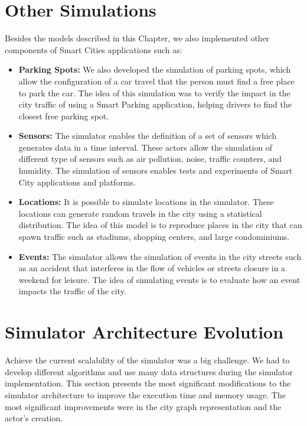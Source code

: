 \section{Other Simulations}
\label{sec:outros}

Besides the models described in this Chapter, we also implemented other components of Smart Cities applications such as:

\begin{itemize}

    \item \textbf{Parking Spots:} We also developed the simulation of parking spots, which allow the configuration of a car travel that the person must find a free place to park the car. The idea of this simulation was to verify the impact in the city traffic of using a Smart Parking application, helping drivers to find the closest free parking spot.
 
    \item \textbf{Sensors:} The simulator enables the definition of a set of sensors which generates data in a time interval. These actors allow the simulation of different type of sensors such as air pollution, noise, traffic counters, and humidity. The simulation of sensors enables tests and experiments of Smart City applications and platforms.
    
    \item \textbf{Locations:} It is possible to simulate locations in the simulator. These locations can generate random travels in the city using a statistical distribution. The idea of this model is to reproduce places in the city that can spawn traffic such as stadiums, shopping centers, and large condominiums.
    
    \item \textbf{Events:} The simulator allows the simulation of events in the city streets such as an accident that interferes in the flow of vehicles or streets closure in a weekend for leisure. The idea of simulating events is to evaluate how an event impacts the traffic of the city.
    
\end{itemize}


\section{Simulator Architecture Evolution}
\label{sec:evolucao}

Achieve the current scalability of the simulator was a big challenge. We had to develop different algorithms and use many data structures during the simulator implementation. This section presents the most significant modifications to the simulator architecture to improve the execution time and memory usage. The most significant improvements were in the city graph representation and the actor's creation.

